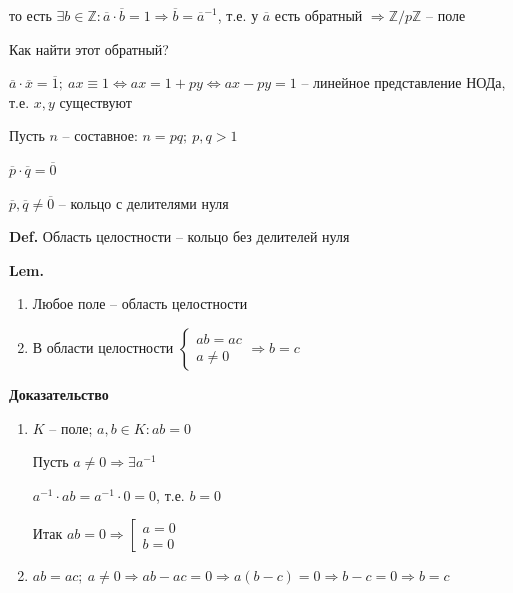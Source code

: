 \documentclass[14pt, letter paper]{article}
\begin{document}
то есть $\exists b \in \mathbb{Z} : \overline{a} \cdot \overline{b} = 1 \Rightarrow \overline{b} = \overline{a}^{-1}$, т.е. у $\overline{a}$ есть обратный $\Rightarrow \mathbb{Z}/p\mathbb{Z}$ -- поле

Как найти этот обратный?

$\overline{a} \cdot \overline{x} = \overline{1};\ ax \equiv 1 \Leftrightarrow ax = 1 + py \Leftrightarrow ax - py = 1$ -- линейное представление НОДа, т.е. $x, y$ существуют

Пусть $n$ -- составное: $n = pq;\ p,q > 1$

$\overline{p} \cdot \overline{q} = \overline{0}$

$\overline{p}, \overline{q} \neq \overline{0}$ -- кольцо с делителями нуля

\textbf{Def.} Область целостности -- кольцо без делителей нуля

\textbf{Lem.}

\begin{enumerate}
    \item Любое поле -- область целостности

    \item В области целостности $\begin{cases}
        ab = ac \\
        a \neq 0
    \end{cases} \Rightarrow b = c$
\end{enumerate}

\begin{center}
    \textbf{Доказательство}
\end{center}

\begin{enumerate}
    \item $K$ -- поле; $a, b \in K : ab = 0$

    Пусть $a \neq 0 \Rightarrow \exists a^{-1}$

    $a^{-1} \cdot ab = a^{-1} \cdot 0 = 0$, т.е. $b = 0$

    Итак $ab = 0 \Rightarrow \left[ \begin{gathered}
        a = 0 \\
        b = 0
    \end{gathered}\right.$

    \item $ab = ac;\ a \neq 0 \Rightarrow ab-ac = 0 \Rightarrow a(b-c) = 0 \Rightarrow b - c = 0 \Rightarrow b = c$

    
\end{enumerate}
\end{document}
